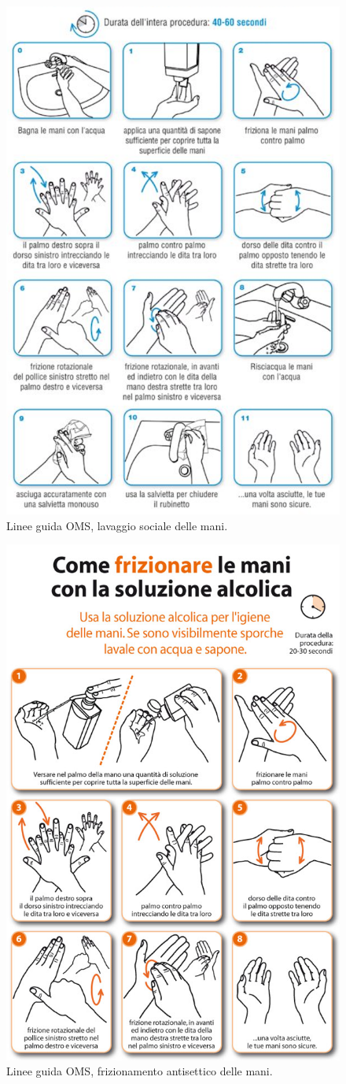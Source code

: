 \begin{figure}[H]
    \begin{center}
    \includegraphics[width=0.5\columnwidth]{img/LAVAGGIO-MANI.png}
    \vspace{-3mm}
    \end{center}
    \caption{Linee guida OMS, lavaggio sociale delle mani.
    \cite{MANIOMS}}
    
\end{figure}

\begin{figure}[H]
    \begin{center}
    \includegraphics[width=0.4\columnwidth]{img/FRIZIONAMENTO-MANI.jpeg}
    \vspace{-3mm}
    \end{center}
    \caption{Linee guida OMS, frizionamento antisettico delle mani.
    \cite{MANIOMS}}
    
\end{figure}

